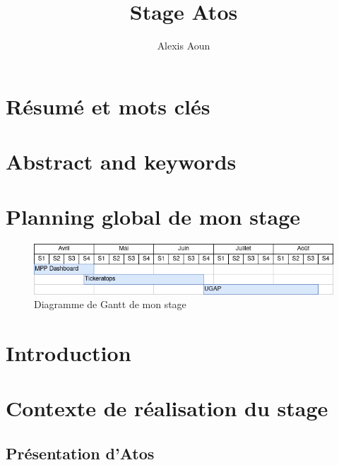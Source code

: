 \documentclass[12pt]{article}
\author {Alexis Aoun}
\begin{document}
\begin {sloppypar}
\title {Stage Atos}
\date {}
\maketitle
\newpage

\def\contentsname{Sommaires}
\tableofcontents
\newpage

\renewcommand{\listfigurename}{Table des matières des illustrations}
\listoffigures
\newpage

\section*{Résumé et mots clés}
\newpage

\section*{Abstract and keywords}
\newpage

\section*{Planning global de mon stage}
\begin{figure}[h]
  \includegraphics[width=\textwidth] {gantt.png}
  \caption {Diagramme de Gantt de mon stage}
\end{figure}
\newpage
\section{Introduction}
\paragraph{}

\section{Contexte de réalisation du stage}
\subsection{Présentation d'Atos}

\end{sloppypar}
\end{document}
